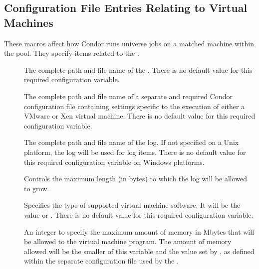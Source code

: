 \subsection{\label{sec:Config-VMs}Configuration File Entries
Relating to Virtual Machines}

These macros affect how Condor runs  universe jobs on
a matched machine within the pool.
They specify items related to the .

\begin{description}
\item[]
  \label{param:VMGAHPServer}
  The complete path and file name of the .
  There is no default value for this required configuration variable.

\item[]
  \label{param:VMGAHPConfig}
  The complete path and file name of a separate and required
  Condor configuration file containing settings specific
  to the execution of either a VMware or Xen virtual machine.
  There is no default value for this required configuration variable.

\item[]
  \label{param:VMGAHPLog}
  The complete path and file name of the  log.
  If not specified on a Unix platform, the 
  log will be used for  log items. 
  There is no default value for this required configuration variable
  on Windows platforms.

\item[]
  \label{param:MaxVMGAHPLog}
  Controls the maximum length (in bytes) to which the  log
  will be allowed to grow.

\item[]
  \label{param:VMType}
  Specifies the type of supported virtual machine software.
  It will be the value \verb@xen@ or \verb@vmware@.
  There is no default value for this required configuration variable.

\item[]
  \label{param:VMMaxMemory}
  An integer to specify the maximum amount of memory in Mbytes
  that will be allowed to the virtual machine program.
  The amount of memory allowed will be the smaller of this
  variable and the value set by , as defined within
  the separate configuration file used by the .


\end{description}
